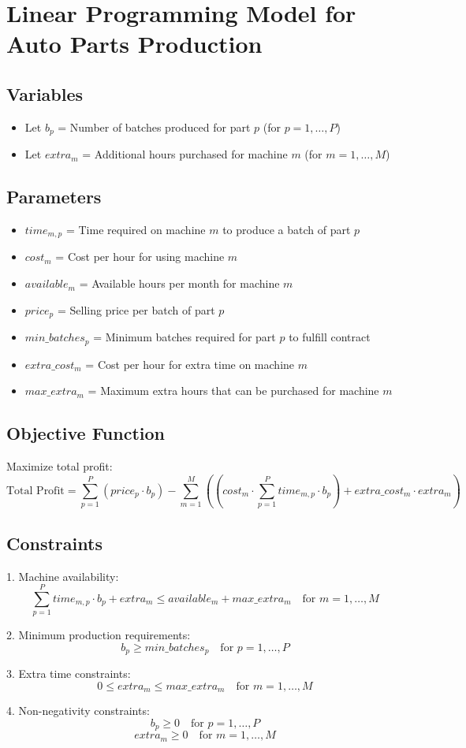 \documentclass{article}
\begin{document}
\section*{Linear Programming Model for Auto Parts Production}

\subsection*{Variables}
\begin{itemize}
    \item Let \( b_p \) = Number of batches produced for part \( p \) (for \( p = 1, \ldots, P \))
    \item Let \( extra_m \) = Additional hours purchased for machine \( m \) (for \( m = 1, \ldots, M \))
\end{itemize}

\subsection*{Parameters}
\begin{itemize}
    \item \( time_{m,p} \) = Time required on machine \( m \) to produce a batch of part \( p \)
    \item \( cost_m \) = Cost per hour for using machine \( m \)
    \item \( available_m \) = Available hours per month for machine \( m \)
    \item \( price_p \) = Selling price per batch of part \( p \)
    \item \( min\_batches_p \) = Minimum batches required for part \( p \) to fulfill contract
    \item \( extra\_cost_m \) = Cost per hour for extra time on machine \( m \)
    \item \( max\_extra_m \) = Maximum extra hours that can be purchased for machine \( m \)
\end{itemize}

\subsection*{Objective Function}
Maximize total profit:
\[
\text{Total Profit} = \sum_{p=1}^{P} \left( price_p \cdot b_p \right) - \sum_{m=1}^{M} \left( (cost_m \cdot \sum_{p=1}^{P} time_{m,p} \cdot b_p) + extra\_cost_m \cdot extra_m \right)
\]

\subsection*{Constraints}
1. Machine availability:
\[
\sum_{p=1}^{P} time_{m,p} \cdot b_p + extra_m \leq available_m + max\_extra_m \quad \text{for } m = 1, \ldots, M
\]

2. Minimum production requirements:
\[
b_p \geq min\_batches_p \quad \text{for } p = 1, \ldots, P
\]

3. Extra time constraints:
\[
0 \leq extra_m \leq max\_extra_m \quad \text{for } m = 1, \ldots, M
\]

4. Non-negativity constraints:
\[
b_p \geq 0 \quad \text{for } p = 1, \ldots, P
\]
\[
extra_m \geq 0 \quad \text{for } m = 1, \ldots, M
\]
\end{document}
